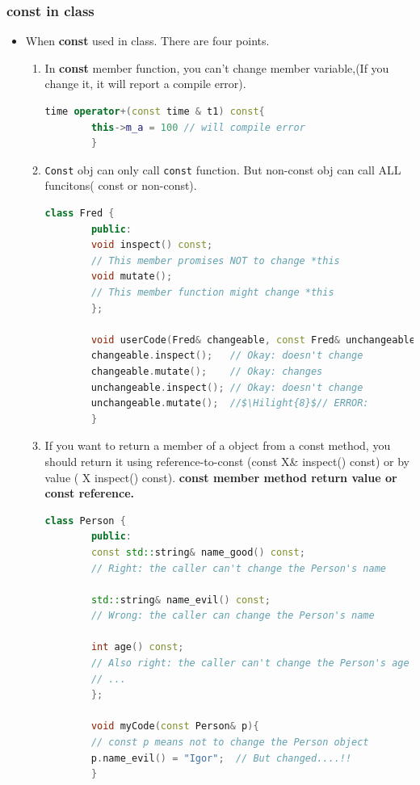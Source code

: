 \documentclass[a4paper,11pt,twoside]{book}
\newcommand{\Hilight}[1]{\makebox[0pt][l]{\color{yellow}\rule[-3pt]{#1em}{11pt}}}
\newcommand{\Hilight}[1]{}
\begin{document}
\subsubsection{const in class}
\begin{itemize}
	
	\item When \textbf{const} used in class. There are four points.
	\begin{enumerate}
		\item In \textbf{const} member function, you can't change member variable,(If you change it, it will report a compile error).
		\begin{lstlisting}[frame=single, language=c++]
		time operator+(const time & t1) const{
		this->m_a = 100 // will compile error
		}
		\end{lstlisting}
		
		\item \texttt{Const} obj can only call \texttt{const} function. But non-const obj can call ALL funcitons( const or non-const).
		\begin{lstlisting}[frame=single, language=c++, mathescape=true]
		class Fred {
		public:
		void inspect() const;
		// This member promises NOT to change *this
		void mutate();
		// This member function might change *this
		};
		
		void userCode(Fred& changeable, const Fred& unchangeable){
		changeable.inspect();   // Okay: doesn't change
		changeable.mutate();    // Okay: changes
		unchangeable.inspect(); // Okay: doesn't change
		unchangeable.mutate();  //$\Hilight{8}$// ERROR:
		}
		\end{lstlisting}
		
		\item If you want to return a member of a object from a const method, you should return it using reference-to-const (const X\& inspect() const) or by value ( X inspect() const). \textbf{const member method return value or const reference.}
		\begin{lstlisting}[frame=single, language=c++]
		class Person {
		public:
		const std::string& name_good() const;
		// Right: the caller can't change the Person's name
		
		std::string& name_evil() const;
		// Wrong: the caller can change the Person's name
		
		int age() const;
		// Also right: the caller can't change the Person's age
		// ...
		};
		
		void myCode(const Person& p){
		// const p means not to change the Person object
		p.name_evil() = "Igor";  // But changed....!!
		}
		\end{lstlisting}
		

\end{enumerate}
\end{itemize}
\end{document}
